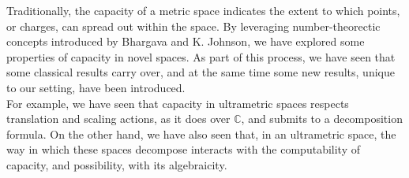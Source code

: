 Traditionally, the capacity of a metric space indicates the extent to which points, or charges, can spread out within the space. By leveraging number-theorectic concepts introduced by Bhargava and K. Johnson, we have explored some properties of capacity in novel spaces.  As part of this process, we have seen that some classical results carry over, and at the same time some new results, unique to our setting, have been introduced.\\

For example, we have seen that capacity in ultrametric spaces respects translation and scaling actions, as it does over $\mathbb{C}$, and submits to a decomposition formula. On the other hand, we have also seen that, in an ultrametric space, the way in which these spaces decompose interacts with the computability of capacity, and possibility, with its algebraicity.